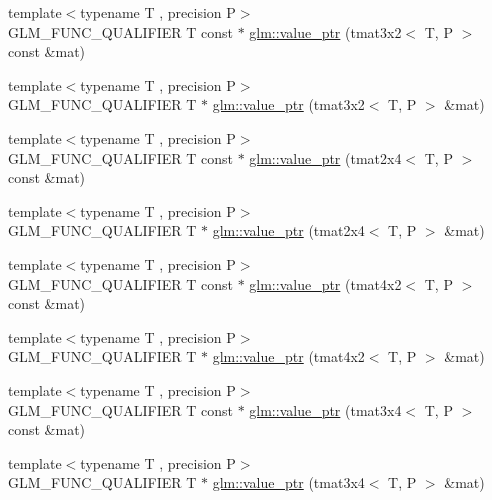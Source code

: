 \begin{DoxyCompactItemize}
\item 
{\footnotesize template$<$typename T , precision P$>$ }\\G\-L\-M\-\_\-\-F\-U\-N\-C\-\_\-\-Q\-U\-A\-L\-I\-F\-I\-E\-R T const $\ast$ \hyperlink{group__gtc__type__ptr_ga398202d6ce304deb7da50badde85ee41}{glm\-::value\-\_\-ptr} (tmat3x2$<$ T, P $>$ const \&mat)
\item 
{\footnotesize template$<$typename T , precision P$>$ }\\G\-L\-M\-\_\-\-F\-U\-N\-C\-\_\-\-Q\-U\-A\-L\-I\-F\-I\-E\-R T $\ast$ \hyperlink{group__gtc__type__ptr_gad6a737f57febdef255873f6a44d0db0e}{glm\-::value\-\_\-ptr} (tmat3x2$<$ T, P $>$ \&mat)
\item 
{\footnotesize template$<$typename T , precision P$>$ }\\G\-L\-M\-\_\-\-F\-U\-N\-C\-\_\-\-Q\-U\-A\-L\-I\-F\-I\-E\-R T const $\ast$ \hyperlink{group__gtc__type__ptr_ga2336cd68e72b0d295c8cd33eb1588480}{glm\-::value\-\_\-ptr} (tmat2x4$<$ T, P $>$ const \&mat)
\item 
{\footnotesize template$<$typename T , precision P$>$ }\\G\-L\-M\-\_\-\-F\-U\-N\-C\-\_\-\-Q\-U\-A\-L\-I\-F\-I\-E\-R T $\ast$ \hyperlink{group__gtc__type__ptr_ga0d745a55255710933effd6391307f681}{glm\-::value\-\_\-ptr} (tmat2x4$<$ T, P $>$ \&mat)
\item 
{\footnotesize template$<$typename T , precision P$>$ }\\G\-L\-M\-\_\-\-F\-U\-N\-C\-\_\-\-Q\-U\-A\-L\-I\-F\-I\-E\-R T const $\ast$ \hyperlink{group__gtc__type__ptr_ga1de002422f32c6da9d65d3f257f37196}{glm\-::value\-\_\-ptr} (tmat4x2$<$ T, P $>$ const \&mat)
\item 
{\footnotesize template$<$typename T , precision P$>$ }\\G\-L\-M\-\_\-\-F\-U\-N\-C\-\_\-\-Q\-U\-A\-L\-I\-F\-I\-E\-R T $\ast$ \hyperlink{group__gtc__type__ptr_ga0e62660f9066864568cd74d76d528a6e}{glm\-::value\-\_\-ptr} (tmat4x2$<$ T, P $>$ \&mat)
\item 
{\footnotesize template$<$typename T , precision P$>$ }\\G\-L\-M\-\_\-\-F\-U\-N\-C\-\_\-\-Q\-U\-A\-L\-I\-F\-I\-E\-R T const $\ast$ \hyperlink{group__gtc__type__ptr_gacbf08ea2313cad8a42652d4455e69709}{glm\-::value\-\_\-ptr} (tmat3x4$<$ T, P $>$ const \&mat)
\item 
{\footnotesize template$<$typename T , precision P$>$ }\\G\-L\-M\-\_\-\-F\-U\-N\-C\-\_\-\-Q\-U\-A\-L\-I\-F\-I\-E\-R T $\ast$ \hyperlink{group__gtc__type__ptr_gafac7c10d557c3db2f061af0ffe8fc9cf}{glm\-::value\-\_\-ptr} (tmat3x4$<$ T, P $>$ \&mat)

\end{DoxyCompactItemize}
